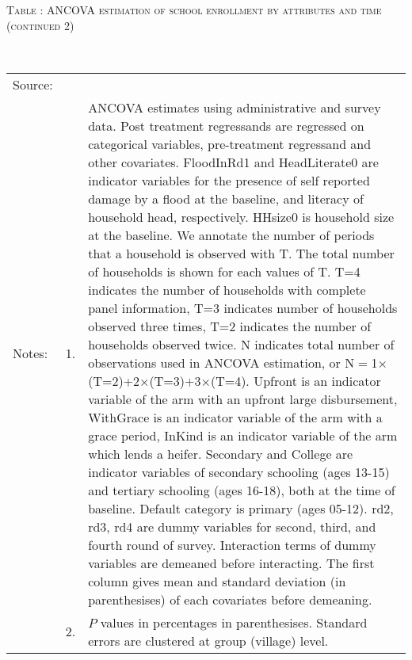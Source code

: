 \hspace{-1cm}\begin{minipage}[t]{14cm}
\hfil\textsc{\normalsize Table \thetable: ANCOVA estimation of school enrollment by attributes and time (continued 2)\label{tab ANCOVA enroll time varying attributes3}}\\
\setlength{\tabcolsep}{1pt}
\setlength{\baselineskip}{8pt}
\renewcommand{\arraystretch}{.525}
\hfil{}\\
\renewcommand{\arraystretch}{.8}
\setlength{\tabcolsep}{1pt}
\hspace{-1cm}\begin{tabular}{>{\hfill\scriptsize}p{1cm}<{}>{\hfill\scriptsize}p{.25cm}<{}>{\scriptsize}p{14cm}<{\hfill}}
Source:& \multicolumn{2}{l}{\scriptsize Estimated with GUK administrative and survey data.}\\
Notes: & 1. & ANCOVA estimates using administrative and survey data. Post treatment regressands are regressed on categorical variables, pre-treatment regressand and other covariates. \textsf{FloodInRd1} and \textsf{HeadLiterate0} are indicator variables for the presence of self reported damage by a flood at the baseline, and literacy of household head, respectively. \textsf{HHsize0} is household size at the baseline. We annotate the number of periods that a household is observed with \textsf{T}. The total number of households is shown for each values of \textsf{T}. \textsf{T=4} indicates the number of households with complete panel information, \textsf{T=3} indicates number of households observed three times, \textsf{T=2} indicates the number of households observed twice. \textsf{N} indicates total number of observations used in ANCOVA estimation, or \textsf{N$=$1$\times$(T=2)+2$\times$(T=3)+3$\times$(T=4)}.  \textsf{Upfront} is an indicator variable of the arm with an upfront large disbursement, \textsf{WithGrace} is an indicator variable of the arm with a grace period, \textsf{InKind} is an indicator variable of the arm which lends a heifer. \textsf{Secondary} and \textsf{College} are indicator variables of secondary schooling (ages 13-15) and tertiary schooling (ages 16-18), both at the time of baseline. Default category is primary (ages 05-12). \textsf{rd2, rd3, rd4} are dummy variables for second, third, and fourth round of survey. Interaction terms of dummy variables are demeaned before interacting. The first column gives mean and standard deviation (in parenthesises) of each covariates before demeaning.\\
& 2. & $P$ values in percentages in parenthesises. Standard errors are clustered at group (village) level.%
\end{tabular}
\end{minipage}
